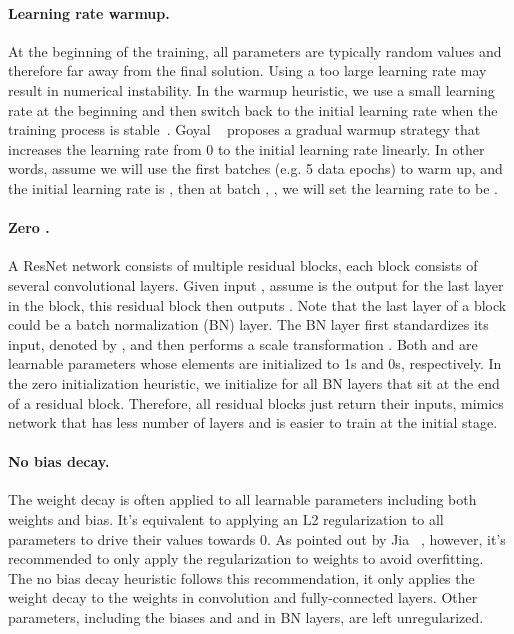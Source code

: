 \documentclass[10pt,twocolumn,letterpaper]{article}
\begin{document}
\paragraph{Learning rate warmup.} At the beginning of the training, all parameters are typically random values and therefore far away from the final solution. Using a too large learning rate may result in numerical instability. In the warmup heuristic, we use a small learning rate at the beginning and then switch back to the initial learning rate when the training process is stable~\cite{he2016deep}. Goyal \etal~\cite{DBLP:journals/corr/GoyalDGNWKTJH17} proposes a gradual warmup strategy that increases the learning rate from 0 to the initial learning rate linearly. In other words, assume we will use the first  batches (e.g. 5 data epochs) to warm up, and the initial learning rate is , then at batch , , we will set the learning rate to be .

\paragraph{Zero .} A ResNet network consists of multiple residual blocks, each block consists of several convolutional layers. Given input , assume  is the output for the last layer in the block, this residual block then outputs . Note that the last layer of a block could be a batch normalization (BN) layer. The BN layer first standardizes its input, denoted by , and then performs a scale transformation . Both  and  are learnable parameters whose elements are initialized to 1s and 0s, respectively. In the zero  initialization heuristic, we initialize  for all BN layers that sit at the end of a residual block. Therefore, all residual blocks just return their inputs, mimics network that has less number of layers and is easier to train at the initial stage.

\paragraph{No bias decay.} The weight decay is often applied to all learnable parameters including both weights and bias. It's equivalent to applying an L2 regularization to all parameters to drive their values towards 0. As pointed out by Jia \etal~\cite{jia2018highly}, however, it's  recommended to only apply the regularization to weights to avoid overfitting. The no bias decay heuristic follows this recommendation, it only applies the weight decay to the weights in convolution and fully-connected layers. Other parameters, including the biases and  and  in BN layers, are left unregularized.
\end{document}
